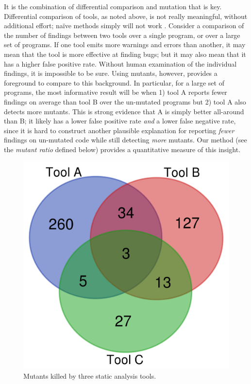 It is the combination of differential comparison and mutation that is key.  Differential comparison of tools, as noted above, is not really meaningful, without additional effort; na\"ive methods simply will not work \cite{regehrRandom}.  Consider a comparison of the number of findings between two tools over a single program, or over a large set of programs.  If one tool emits more warnings and errors than another, it may mean that the tool is more effective at finding bugs; but it may also mean that it has a higher false positive rate.  Without human examination of the individual findings, it is impossible to be sure.  Using mutants, however, provides a foreground to compare to this background.  In particular, for a large set of programs, the most informative result will be when 1) tool A reports fewer findings on average than tool B over the un-mutated programs but 2) tool A also detects more mutants.  This is strong evidence that A is simply better all-around than B; it likely has a lower false positive rate \emph{and} a lower false negative rate, since it is hard to construct another plausible explanation for reporting \emph{fewer} findings on un-mutated code while still detecting \emph{more} mutants.  Our method (see the \emph{mutant ratio} defined below) provides a quantitative measure of this insight.

\begin{figure}
  \centering
  \includegraphics[width=0.35\columnwidth]{example.png}
  \caption{Mutants killed by three static analysis tools.}
  \label{fig:examplevenn}
\end{figure}

